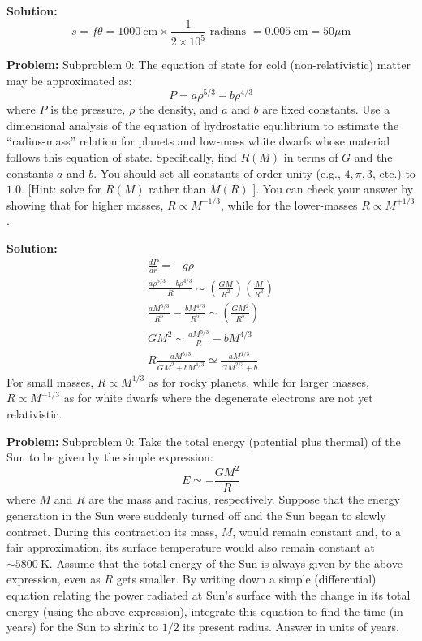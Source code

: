\documentclass[10pt]{article}
\begin{document}
\textbf{Solution:}
\[
s=f \theta=1000 \mathrm{~cm} \times \frac{1}{2 \times 10^{5}} \text { radians }=0.005 \mathrm{~cm}=\boxed{50} \mu \mathrm{m}
\]


\textbf{Problem:}
Subproblem 0: The equation of state for cold (non-relativistic) matter may be approximated as:
\[
P=a \rho^{5 / 3}-b \rho^{4 / 3}
\]
where $P$ is the pressure, $\rho$ the density, and $a$ and $b$ are fixed constants. Use a dimensional analysis of the equation of hydrostatic equilibrium to estimate the ``radius-mass'' relation for planets and low-mass white dwarfs whose material follows this equation of state. Specifically, find $R(M)$ in terms of $G$ and the constants $a$ and $b$. You should set all constants of order unity (e.g., $4, \pi, 3$, etc.) to $1.0$. [Hint: solve for $R(M)$ rather than $M(R)$ ]. You can check your answer by showing that for higher masses, $R \propto M^{-1 / 3}$, while for the lower-masses $R \propto M^{+1 / 3}$.


\textbf{Solution:}
\[
\begin{gathered}
\frac{d P}{d r}=-g \rho \\
\frac{a \rho^{5 / 3}-b \rho^{4 / 3}}{R} \sim\left(\frac{G M}{R^{2}}\right)\left(\frac{M}{R^{3}}\right) \\
\frac{a M^{5 / 3}}{R^{6}}-\frac{b M^{4 / 3}}{R^{5}} \sim\left(\frac{G M^{2}}{R^{5}}\right) \\
G M^{2} \sim \frac{a M^{5 / 3}}{R}-b M^{4 / 3} \\
R \frac{a M^{5 / 3}}{G M^{2}+b M^{4 / 3}} \simeq \boxed{\frac{a M^{1 / 3}}{G M^{2 / 3}+b}}
\end{gathered}
\]
For small masses, $R \propto M^{1 / 3}$ as for rocky planets, while for larger masses, $R \propto M^{-1 / 3}$ as for white dwarfs where the degenerate electrons are not yet relativistic.


\textbf{Problem:}
Subproblem 0: Take the total energy (potential plus thermal) of the Sun to be given by the simple expression:
\[
E \simeq-\frac{G M^{2}}{R}
\]
where $M$ and $R$ are the mass and radius, respectively. Suppose that the energy generation in the Sun were suddenly turned off and the Sun began to slowly contract. During this contraction its mass, $M$, would remain constant and, to a fair approximation, its surface temperature would also remain constant at $\sim 5800 \mathrm{~K}$. Assume that the total energy of the Sun is always given by the above expression, even as $R$ gets smaller. By writing down a simple (differential) equation relating the power radiated at Sun's surface with the change in its total energy (using the above expression), integrate this equation to find the time (in years) for the Sun to shrink to $1 / 2$ its present radius.  Answer in units of years.
\end{document}
